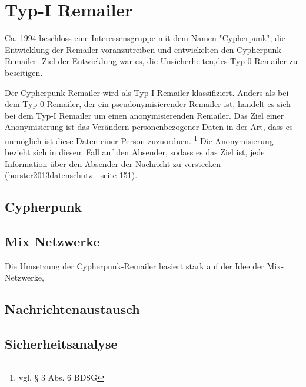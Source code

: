\chapter{Typ-I Remailer}
Ca. 1994 beschloss eine Interessensgruppe mit dem Namen "Cypherpunk", die Entwicklung der Remailer voranzutreiben und entwickelten den Cypherpunk-Remailer. Ziel der Entwicklung war es, die Unsicherheiten,des Typ-0 Remailer zu beseitigen. 

Der Cypherpunk-Remailer wird als Typ-I Remailer klassifiziert. Anders als bei dem Typ-0 Remailer, der ein pseudonymisierender Remailer ist, handelt es sich bei dem Typ-I Remailer um einen anonymisierenden Remailer. Das Ziel einer Anonymisierung ist das Verändern personenbezogener Daten in der Art, dass es unmöglich ist diese Daten einer Person zuzuordnen. \footnote {vgl. § 3 Abs. 6 BDSG}
Die Anonymisierung bezieht sich in diesem Fall auf den Absender, sodass es das Ziel ist, jede Information über den Absender der Nachricht zu verstecken (horster2013datenschutz - seite 151).  


\section{Cypherpunk}

\section{Mix Netzwerke}
Die Umsetzung der Cypherpunk-Remailer basiert stark auf der Idee der Mix-Netzwerke, 

\section{Nachrichtenaustausch}

\section{Sicherheitsanalyse}

